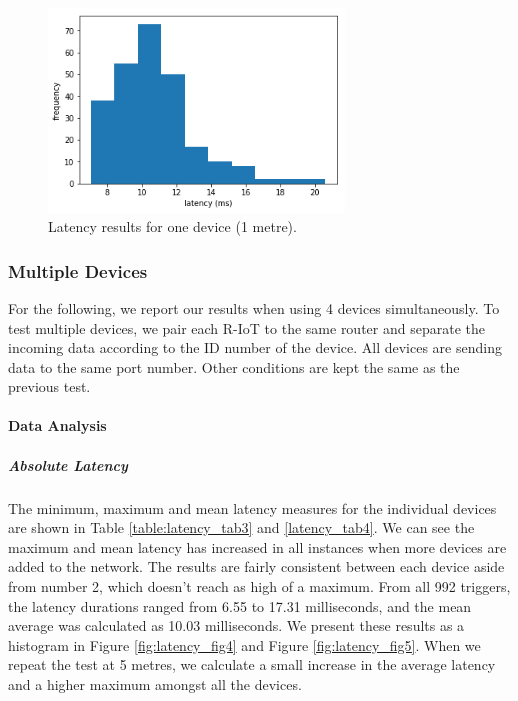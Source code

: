 \begin{figure}[htbp]
  \centering
    \includegraphics[width=0.7\textwidth]{Chapters/Figures/technical/Latency/figure3.png}
    \caption{Latency results for one device (1 metre).}
    \label{fig:latency_fig3}
\end{figure}

\subsubsection{Multiple Devices}

For the following, we report our results when using 4 devices simultaneously. To test multiple devices, we pair each R-IoT to the same router and separate the incoming data according to the ID number of the device. All devices are sending data to the same port number. Other conditions are kept the same as the previous test.

\paragraph{Data Analysis}

\subparagraph{Absolute Latency}
The minimum, maximum and mean latency measures for the individual devices are shown in Table \ref{table:latency_tab3} and \ref{latency_tab4}. We can see the maximum and mean latency has increased in all instances when more devices are added to the network. The results are fairly consistent between each device aside from number 2, which doesn’t reach as high of a maximum. From all 992 triggers, the latency durations ranged from 6.55 to 17.31 milliseconds, and the mean average was calculated as 10.03 milliseconds. We present these results as a histogram in Figure \ref{fig:latency_fig4} and Figure \ref{fig:latency_fig5}. When we repeat the test at 5 metres, we calculate a small increase in the average latency and a higher maximum amongst all the devices.


